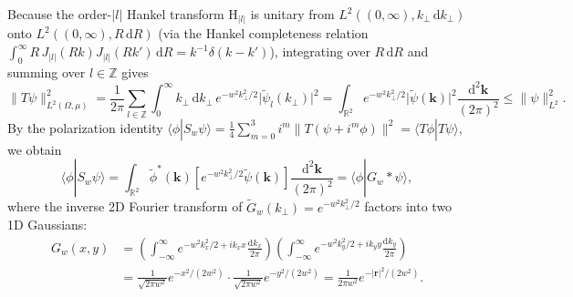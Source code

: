 \documentclass[10pt,letterpaper]{article}
\newcommand{\braket}[2]{\langle #1 | #2 \rangle}
\newcommand{\norm}[1]{\lVert #1 \rVert}
\newcommand{\abs}[1]{\lvert #1 \rvert}
\newcommand{\dd}{\mathrm{d}}
\numberwithin{equation}{section}
\begin{document}
Because the order-$\abs{l}$ Hankel transform $\mathrm{H}_{\abs{l}}$ is unitary from $L^2((0,\infty), k_\perp\,\dd k_\perp)$ onto $L^2((0,\infty), R\,\dd R)$ (via the Hankel completeness relation $\int_0^\infty R\,J_{\abs{l}}(Rk) J_{\abs{l}}(Rk')\,\dd R = k^{-1}\delta(k-k')$), integrating over $R\,\dd R$ and summing over $l \in \mathbb{Z}$ gives
\begin{equation}
  \norm{T\psi}_{L^2(\Omega,\mu)}^2 = \frac{1}{2\pi}\sum_{l\in\mathbb{Z}} \int_0^\infty k_\perp\,\dd k_\perp\, e^{-w^2 k_\perp^2/2}\abs{\widetilde{\psi}_l(k_\perp)}^2 = \int_{\mathbb{R}^2} e^{-w^2 k_\perp^2/2}\abs{\widetilde{\psi}(\mathbf{k})}^2 \frac{\dd^2\mathbf{k}}{(2\pi)^2} \le \norm{\psi}_{L^2}^2.
  \label{eq:walk_bessel}
\end{equation}
By the polarization identity $\braket{\phi}{S_w\psi} = \frac{1}{4}\sum_{m=0}^3 i^m \norm{T(\psi + i^m\phi)}^2 = \braket{T\phi}{T\psi}$, we obtain
\begin{equation}
  \braket{\phi}{S_w\psi} = \int_{\mathbb{R}^2} \widetilde{\phi}^*(\mathbf{k}) \left[e^{-w^2 k_\perp^2/2}\widetilde{\psi}(\mathbf{k})\right]\frac{\dd^2\mathbf{k}}{(2\pi)^2} = \braket{\phi}{G_w * \psi},
\end{equation}
where the inverse 2D Fourier transform of $\widetilde{G}_w(k_\perp) = e^{-w^2 k_\perp^2/2}$ factors into two 1D Gaussians:
\begin{align}
  G_w(x,y) &= \left(\int_{-\infty}^\infty e^{-w^2 k_x^2/2 + ik_x x}\frac{\dd k_x}{2\pi}\right)\left(\int_{-\infty}^\infty e^{-w^2 k_y^2/2 + ik_y y}\frac{\dd k_y}{2\pi}\right) \nonumber \\
  &= \frac{1}{\sqrt{2\pi w^2}}e^{-x^2/(2w^2)} \cdot \frac{1}{\sqrt{2\pi w^2}}e^{-y^2/(2w^2)} = \frac{1}{2\pi w^2}e^{-\abs{\mathbf{r}}^2/(2w^2)}.
\end{align}
\end{document}
